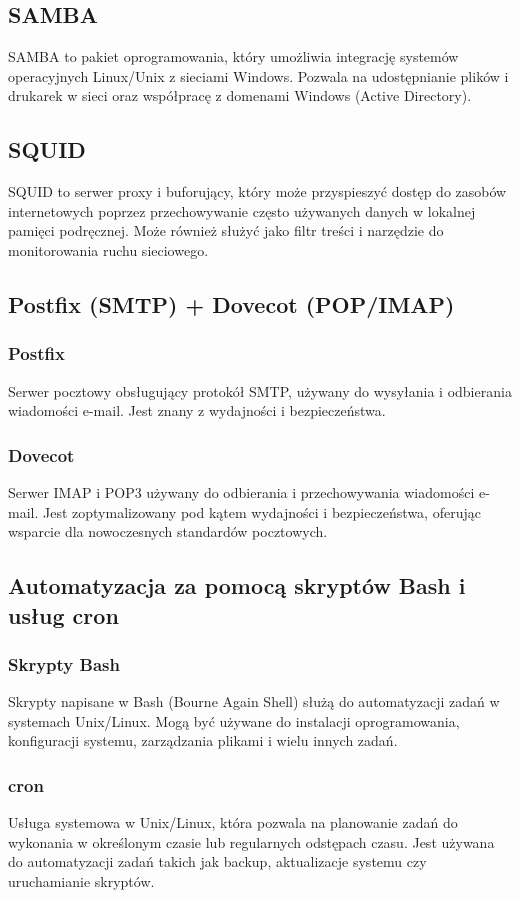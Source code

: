 \documentclass[a4paper]{article}
\begin{document}
\subsection{SAMBA}
SAMBA to pakiet oprogramowania, który umożliwia integrację systemów operacyjnych Linux/Unix z sieciami Windows. Pozwala na udostępnianie plików i drukarek w sieci oraz współpracę z domenami Windows (Active Directory).

\subsection{SQUID}
SQUID to serwer proxy i buforujący, który może przyspieszyć dostęp do zasobów internetowych poprzez przechowywanie często używanych danych w lokalnej pamięci podręcznej. Może również służyć jako filtr treści i narzędzie do monitorowania ruchu sieciowego.

\subsection{Postfix (SMTP) + Dovecot (POP/IMAP)}
\subsubsection{Postfix}
Serwer pocztowy obsługujący protokół SMTP, używany do wysyłania i odbierania wiadomości e-mail. Jest znany z wydajności i bezpieczeństwa.

\subsubsection{Dovecot}
Serwer IMAP i POP3 używany do odbierania i przechowywania wiadomości e-mail. Jest zoptymalizowany pod kątem wydajności i bezpieczeństwa, oferując wsparcie dla nowoczesnych standardów pocztowych.

\subsection{Automatyzacja za pomocą skryptów Bash i usług cron}
\subsubsection{Skrypty Bash}
Skrypty napisane w Bash (Bourne Again Shell) służą do automatyzacji zadań w systemach Unix/Linux. Mogą być używane do instalacji oprogramowania, konfiguracji systemu, zarządzania plikami i wielu innych zadań.

\subsubsection{cron}
Usługa systemowa w Unix/Linux, która pozwala na planowanie zadań do wykonania w określonym czasie lub regularnych odstępach czasu. Jest używana do automatyzacji zadań takich jak backup, aktualizacje systemu czy uruchamianie skryptów.
\end{document}
